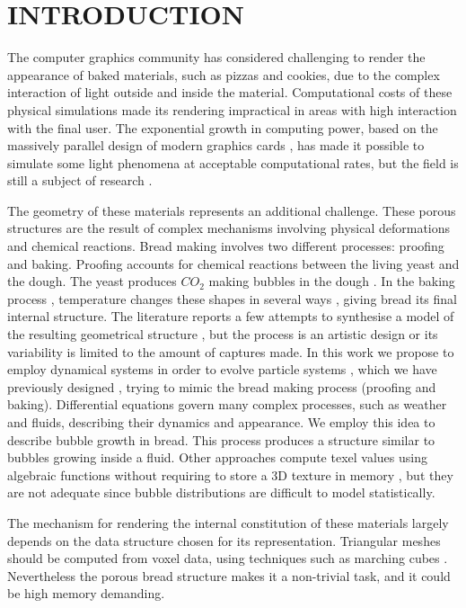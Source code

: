 \documentclass[oneside,a4paper,english,links]{amca}
\begin{document}
\section{INTRODUCTION}

The computer graphics community has considered challenging to render the appearance of  baked materials, such as
pizzas and cookies, due to
the complex interaction of light outside and inside the
material. Computational costs of these
physical simulations made its rendering impractical in areas with high
interaction with the final user. The exponential growth in
computing power, based on the massively parallel design of modern
graphics cards \citep{Yeo09,Harris06}, has made it possible to
simulate some light phenomena at acceptable computational rates, but
the field is still a subject of research \citep{Voglsam2013}.

The geometry of these materials represents an additional challenge. These porous structures are the
result of complex mechanisms involving physical deformations and
chemical reactions. Bread making involves two different
processes: proofing and baking. Proofing accounts for
chemical reactions between the living yeast and the dough. The yeast
produces $CO_{2}$ making bubbles in the dough
\citep{Shah1998}. In the baking process \citep{Mondal2008},
temperature changes these shapes in several ways \citep{Scanlon2001},
giving bread its final internal structure. The literature reports a few attempts to
synthesise a model of the resulting geometrical structure \citep{VanDyck2014,Cho2007}, but the process is an artistic design or its variability is limited to the amount of captures
made. In this work we propose to employ dynamical systems
\citep{Strogatz2001} in order to evolve particle systems
\citep{Reeves83}, which we have previously designed
\citep{Baravalle2011}, trying to mimic the bread making process
(proofing and baking). Differential equations govern many complex processes, such as weather and
fluids, describing their
dynamics and appearance. We employ this idea
to describe bubble growth in bread. This process produces a
structure similar to bubbles growing inside a fluid. Other approaches compute
texel values using algebraic functions without requiring to
store a 3D texture in memory \citep{Perlin1989}, but they
are not adequate since bubble distributions are difficult to
model statistically.

The mechanism for rendering the internal constitution of these materials largely depends
on the data structure chosen for its representation. Triangular
meshes should be computed from voxel data, using
techniques such as marching cubes \citep{Lorensen1987}. Nevertheless
the porous bread structure makes it a non-trivial task, and it
could be high memory demanding.
\end{document}
